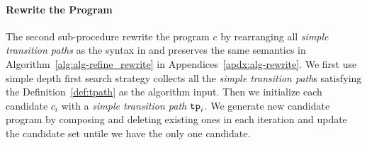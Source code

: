 
\paragraph{Rewrite the Program}
The second sub-procedure rewrite the program $c$ by rearranging all \emph{simple transition paths} as the syntax in \cite{GulwaniJK09} and preserves the same semantics in Algorithm~\ref{alg:alg-refine_rewrite} in Appendices~\ref{apdx:alg-rewrite}.
We first use simple depth first search strategy collects all the \emph{simple transition path}s satisfying the Definition~\ref{def:tpath} as the algorithm input. Then we initialize each candidate $c_i$ with a \emph{simple transition path} $\mathtt{tp}_i$. We generate new candidate program by composing and deleting existing ones in each iteration and update the candidate set untile we have the only one candidate.
